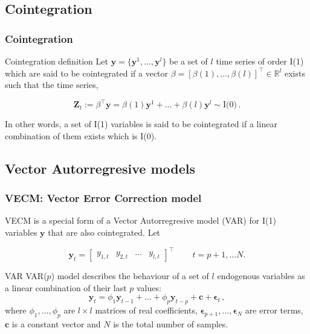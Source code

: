 \documentclass[xcolor=dvipsnames]{beamer}
\begin{document}
\subsection{Cointegration}
\begin{frame}
\frametitle{Cointegration}
\begin{block}{Cointegration definition}
Let $\mathbf{y} = \{\mathbf{y}^1, \dots, \mathbf{y}^l\}$ be a set of $l$
time series of order I(1) which are said to be cointegrated if a vector
$\beta=[\beta(1),\dots,\beta(l)]^\top \in \mathbb{R}^l$  exists such that the
time series,

\begin{equation*}
 \mathbf{Z}_t:= \beta^\top \mathbf{y} = \beta(1) \mathbf{y}^1 + \dots + \beta(l) \mathbf{y}^l \sim
 \text{I(0)}\, .
\end{equation*}
\end{block}
In other words, a set of I(1) variables is said to be cointegrated if
a linear combination of them exists which is I(0).

\end{frame}

\subsection{Vector Autorregresive models}
\begin{frame}
\frametitle{VECM: Vector Error Correction model}

VECM is a special form of a Vector Autorregresive model (VAR) for I(1)
variables $\mathbf{y}$ that are also cointegrated. Let 

\begin{equation*}
\label{eq:variables}
\mathbf{y}_t = 
\begin{bmatrix} y_{1,t} & y_{2,t} & \dots & y_{l,t}
\end{bmatrix}^\top \, \qquad t=p+1, \dots N. 
\end{equation*}

\begin{block}{VAR}
VAR($p$) model describes the behaviour of a set of $l$
endogenous variables as a linear combination of their last $p$ values:
{\color{blue}
\begin{equation*}
\label{eq:var}
 \mathbf{y}_t = \phi_1 \mathbf{y}_{t-1}  + \dots +   \phi_p\mathbf{y}_{t-p}
+ \mathbf{c} + \mathbf{\epsilon}_t \, ,
\end{equation*}}
\noindent where  ${\phi_1,\dots,\phi_p}$ are $l \times l$
matrices of real coefficients,
$\mathbf{\epsilon}_{p+1},\dots,\mathbf{\epsilon}_N$ are error terms,
$\mathbf{c}$ is a constant vector and $N$ is the total number of samples.
\end{block}
\end{frame}
\end{document}
